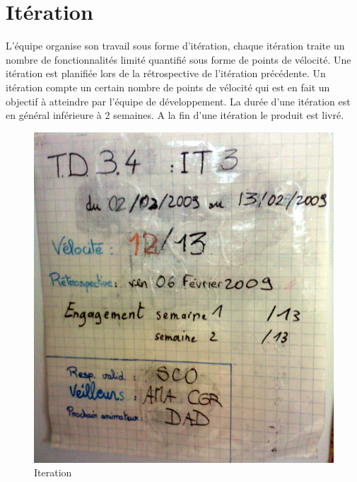 \section{Itération}
L'équipe organise son travail sous forme d'itération, chaque itération traite un nombre de fonctionnalités limité quantifié sous forme de points de vélocité. Une itération est planifiée lors de la rétrospective de l'itération précédente. Un itération compte un certain nombre de points de vélocité qui est en fait un objectif à atteindre par l'équipe de développement. La durée d'une itération est en général inférieure à 2 semaines. A la fin d'une itération le produit est livré.
\begin{figure}[!h]
\centering
\includegraphics[scale=0.10]{Illustrations/SP_A0182.jpg}
\caption{Iteration}
\label{fig:Iteration}
\end{figure}

